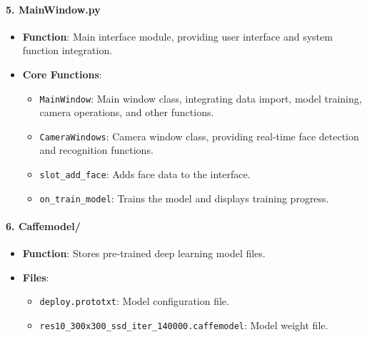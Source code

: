 \documentclass{article}
\begin{document}
\paragraph{5. MainWindow.py}
\begin{itemize}
    \item \textbf{Function}: Main interface module, providing user interface and system function integration.
    \item \textbf{Core Functions}:
    \begin{itemize}
        \item \texttt{MainWindow}: Main window class, integrating data import, model training, camera operations, and other functions.
        \item \texttt{CameraWindows}: Camera window class, providing real-time face detection and recognition functions.
        \item \texttt{slot\_add\_face}: Adds face data to the interface.
        \item \texttt{on\_train\_model}: Trains the model and displays training progress.
    \end{itemize}
\end{itemize}

\paragraph{6. Caffemodel/}
\begin{itemize}
    \item \textbf{Function}: Stores pre-trained deep learning model files.
    \item \textbf{Files}:
    \begin{itemize}
        \item \texttt{deploy.prototxt}: Model configuration file.
        \item \texttt{res10\_300x300\_ssd\_iter\_140000.caffemodel}: Model weight file.
    \end{itemize}
\end{itemize}
\end{document}
